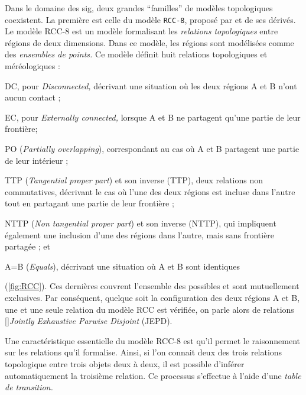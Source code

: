 Dans le domaine des \ac{sig}, deux grandes \enquote{familles} de
modèles topologiques coexistent. La première est celle du modèle
\texttt{RCC-8}, proposé par \textcite{Randell1992} et de ses
dérivés. Le modèle RCC-8 est un modèle formalisant les \emph{relations
  topologiques} entre régions de deux dimensions. Dans ce modèle, les
régions sont modélisées comme des \emph{ensembles de points.} Ce
modèle définit huit relations topologiques et méréologiques :
%
\begin{enumerate*}[label=(\alph*)]
\item DC, pour \emph{Disconnected,} décrivant une situation où les
  deux régions \textcolor{RdBu-9-1}{A} et \textcolor{RdBu-9-9}{B} n'ont
  aucun contact ;
\item EC, pour \emph{Externally connected,} lorsque
  \textcolor{RdBu-9-1}{A} et \textcolor{RdBu-9-9}{B} ne partagent
  qu'une partie de leur frontière;
\item PO (\emph{Partially overlapping}), correspondant au cas où
  \textcolor{RdBu-9-1}{A} et \textcolor{RdBu-9-9}{B} partagent une
  partie de leur intérieur ;
\item TTP (\emph{Tangential proper part}) et son inverse (TTP),
  deux relations non commutatives, décrivant le cas où l'une des deux
  régions est incluse dans l'autre tout en partagant une partie de
  leur frontière ;
\item NTTP (\emph{Non tangential proper part}) et son inverse
  (NTTP), qui impliquent également une inclusion d'une des
  régions dans l'autre, mais sans frontière partagée ; et
\item A=B (\emph{Equals}), décrivant une situation où
  \textcolor{RdBu-9-1}{A} et \textcolor{RdBu-9-9}{B} sont identiques
\end{enumerate*}
%
(\autoref{fig:RCC}).
%
Ces dernières couvrent l'ensemble des possibles et sont mutuellement
exclusives. Par conséquent, quelque soit la configuration des deux
régions \textcolor{RdBu-9-1}{A} et \textcolor{RdBu-9-9}{B}, une et une
seule relation du modèle RCC est vérifiée, on parle alors de relations
[{\cite{Duchene2019}}]{\emph{Jointly
    Exhaustive Parwise Disjoint}} (JEPD).

Une caractéristique essentielle du modèle RCC-8 est qu'il permet le
raisonnement sur les relations qu'il formalise. Ainsi, si l'on connait
deux des trois relations topologique entre trois objets deux à deux,
il est possible d'inférer automatiquement la troisième relation. Ce
processus s’effectue à l'aide d'une \emph{table de transition.}


